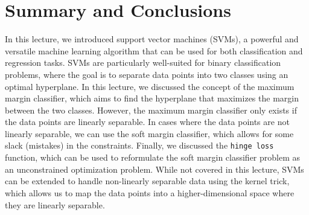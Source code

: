 \documentclass{article}[11pt]
\begin{document}
\section{Summary and Conclusions}
In this lecture, we introduced support vector machines (SVMs), a powerful and versatile machine learning algorithm that can be used for both classification and regression tasks.
SVMs are particularly well-suited for binary classification problems, where the goal is to separate data points into two classes using an optimal hyperplane.
In this lecture, we discussed the concept of the maximum margin classifier, which aims to find the hyperplane that maximizes the margin between the two classes.
However, the maximum margin classifier only exists if the data points are linearly separable. 
In cases where the data points are not linearly separable, we can use the soft margin classifier, which allows for some slack (mistakes) in the constraints.
Finally, we discussed the \texttt{hinge loss} function, which can be used to reformulate the soft margin classifier problem as an unconstrained optimization problem.
While not covered in this lecture, SVMs can be extended to handle non-linearly separable data using the kernel trick, which allows us to map the data points into a 
higher-dimensional space where they are linearly separable. 

\raggedright

\end{document}
